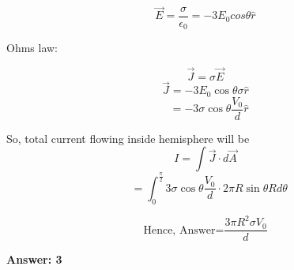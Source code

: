 \documentclass[11pt,a4paper]{scrartcl}
\begin{document}
\begin{solution}
$$\boxed{\vec{E} = \frac{\sigma}{\epsilon_0}=-3E_0 cos\theta \hat{r}} $$

Ohms law:

$$\vec{J}=\sigma \vec{E}$$
$$\vec{J} = -3E_0 \cos \theta \sigma \hat{r}$$
$$\ \ \ = -3\sigma \cos\theta\frac{V_0}{d} \hat{r}$$

So, total current flowing inside hemisphere will be 
$$ I= \int \vec{J} \cdot d \vec{A}$$
$$\ \ \ = \int_0^{\frac{\pi}{2}} 3\sigma \cos\theta\frac{V_0}{d} \cdot 2\pi R \sin \theta R d \theta$$

$$\boxed{\text{Hence, Answer=} \frac{3\pi R^2 \sigma V_0}{d}}$$
 
\textbf{Answer: 3}

\end{solution}

\vspace{1cm}%
\end{document}
